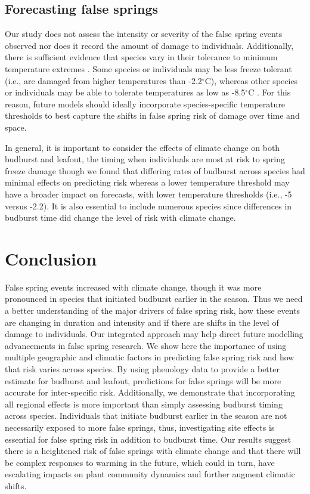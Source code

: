 \documentclass{article}\usepackage[]{graphicx}\usepackage[]{color}
\begin{document}
\subsection*{Forecasting false springs}
Our study does not assess the intensity or severity of the false spring events observed nor does it record the amount of damage to individuals. Additionally, there is sufficient evidence that species vary in their tolerance to minimum temperature extremes \citep{Korner2016, Lenz2013, Zhuo2018,bennett2018globtherm}. Some species or individuals may be less freeze tolerant (i.e., are damaged from higher temperatures than -2.2$^{\circ}$C), whereas other species or individuals may be able to tolerate temperatures as low as -8.5$^{\circ}$C \citep{Lenz2016}. For this reason, future models should ideally incorporate species-specific temperature thresholds to best capture the shifts in false spring risk of damage over time and space. 

In general, it is important to consider the effects of climate change on both budburst and leafout, the timing when individuals are most at risk to spring freeze damage \citep{Chamberlain2019,Lenz2016} though we found that differing rates of budburst across species had minimal effects on predicting risk whereas a lower temperature threshold may have a broader impact on forecasts, with lower temperature thresholds (i.e., -5 versus -2.2). It is also essential to include numerous species since differences in budburst time did change the level of risk with climate change. 

\section*{Conclusion}
False spring events increased with climate change, though it was more pronounced in species that initiated budburst earlier in the season. Thus we need a better understanding of the major drivers of false spring risk, how these events are changing in duration and intensity and if there are shifts in the level of damage to individuals. Our integrated approach may help direct future modelling advancements in false spring research. We show here the importance of using multiple geographic and climatic factors in predicting false spring risk and how that risk varies across species. By using phenology data to provide a better estimate for budburst and leafout, predictions for false springs will be more accurate for inter-specific risk. Additionally, we demonstrate that incorporating all regional effects is more important than simply assessing budburst timing across species. Individuals that initiate budburst earlier in the season are not necessarily exposed to more false springs, thus, investigating site effects is essential for false spring risk in addition to budburst time. Our results suggest there is a heightened risk of false springs with climate change and that there will be complex responses to warming in the future, which could in turn, have escalating impacts on plant community dynamics and further augment climatic shifts. 
\end{document}

